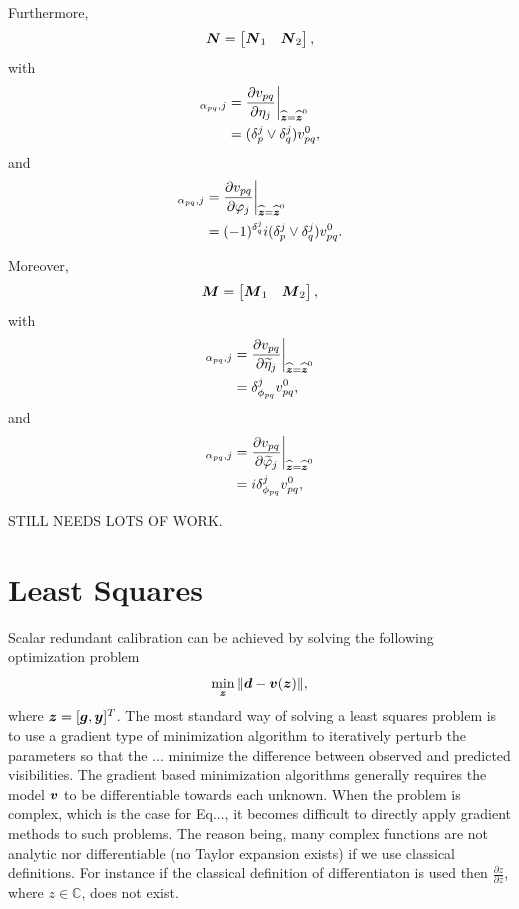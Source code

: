 \documentclass[useAMS,usenatbib]{mn2e}
\newcommand{\bz}{\bmath{z}}
\newcommand{\bg}{\bmath{g}}
\newcommand{\bd}{\bmath{d}}
\newcommand{\bv}{\bmath{v}}
\newcommand{\by}{\bmath{y}}
\newcommand{\bN}{\bmath{N}}
\newcommand{\bM}{\bmath{M}}
\newcommand{\conj}[1]{\overline{#1}}
\begin{document}
Furthermore, 
\begin{equation}
\bN = \begin{bmatrix}
      \bN_1 & \bN_2 
      \end{bmatrix},
\end{equation}
with 
\begin{align}
[\bN_1]_{\alpha_{pq},j} &= \frac{\partial v_{pq}}{\partial \eta_j} {\bigg |}_{\widehat{\bz}=\widehat{\bz}^0}\\
&= (\delta_{p}^{j}\vee\delta_{q}^{j}) v_{pq}^0,
\end{align}
and
\begin{align}
 [\bN_2]_{\alpha_{pq},j} &= \frac{\partial v_{pq}}{\partial \varphi_j} {\bigg |}_{\widehat{\bz}=\widehat{\bz}^0}\\
 &= (-1)^{\delta_{q}^{j}}i(\delta_{p}^{j}\vee\delta_{q}^{j}) v_{pq}^0. 
\end{align}

Moreover,
\begin{equation}
\bM = \begin{bmatrix}
      \bM_1 & \bM_2 
      \end{bmatrix},
\end{equation}
with
\begin{align}
[\bM_1]_{\alpha_{pq},j} &= \frac{\partial v_{pq}}{\partial \widetilde{\eta}_j} {\bigg |}_{\widehat{\bz}=\widehat{\bz}^0}\\
&=  \delta_{\phi_{pq}}^{j} v_{pq}^0,
\end{align}
and
\begin{align}
[\bM_2]_{\alpha_{pq},j} &= \frac{\partial v_{pq}}{\partial \widetilde{\varphi}_j} {\bigg |}_{\widehat{\bz}=\widehat{\bz}^0}\\
&= i\delta_{\phi_{pq}}^{j} v_{pq}^0,
\end{align}

STILL NEEDS LOTS OF WORK.

\section{Least Squares}
Scalar redundant calibration can be achieved by solving the following optimization problem
\begin{equation}
\label{eq:red_least_squares}
\min_{\bz} \|\bd - \bv(\bz)\|, 
\end{equation}
where $\bz = [\bg,\by]^T$.
The most standard way of solving a least squares problem is to use a gradient type of minimization algorithm to iteratively perturb the parameters so that the ... minimize the 
difference between observed and predicted visibilities. The gradient based minimization algorithms generally requires the model $\bv$ to be differentiable
towards each unknown. When the problem is complex, which is the case for Eq..., it becomes difficult to directly apply gradient methods to such problems. The reason being,
many complex functions are not analytic nor differentiable (no Taylor expansion exists) if we use classical definitions. For instance if the 
classical definition of differentiaton is used then $\frac{\partial z}{\partial \conj{z}}$, where $z \in \mathbb{C}$, does not exist.
\end{document}
